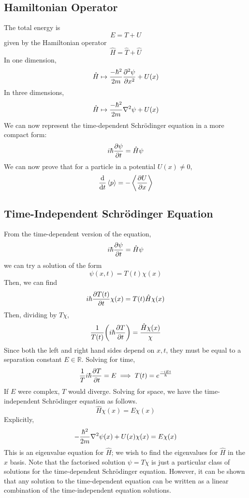 \subsection{Hamiltonian Operator}
The total energy is
\[
	E = T + U
\]
given by the Hamiltonian operator
\[
	\hat H = \hat T + \hat U
\]
In one dimension,
\[
	\hat H \mapsto \frac{-\hbar^2}{2m} \pdv[2]{\psi}{x} + U(x)
\]
In three dimensions,
\[
	\hat H \mapsto \frac{-\hbar^2}{2m} \laplacian \psi + U(x)
\]
We can now represent the time-dependent Schr\"odinger equation in a more compact form:
\[
	i\hbar \pdv{\psi}{t} = \hat H \psi
\]
We can now prove that for a particle in a potential \( U(x) \neq 0 \),
\[
	\dv{t} \left\langle{p}\right\rangle = -\left\langle{\pdv{U}{x}}\right\rangle
\]

\subsection{Time-Independent Schr\"odinger Equation}
From the time-dependent version of the equation,
\[
	i\hbar \pdv{\psi}{t} = \hat H \psi
\]
we can try a solution of the form
\[
	\psi(x,t) = T(t) \chi(x)
\]
Then, we can find
\[
	i \hbar \pdv{T(t)}{t} \chi(x) = T(t) \hat H \chi(x)
\]
Then, dividing by \( T \chi \),
\[
	\frac{1}{T(t)} \qty(i \hbar \pdv{T}{t}) = \frac{\hat H \chi(x)}{\chi}
\]
Since both the left and right hand sides depend on \( x, t \), they must be equal to a separation constant \( E \in \mathbb R \).
Solving for time,
\[
	\frac{1}{T} i \hbar \pdv{T}{t} = E \implies T(t) = e^{\frac{-i Et}{\hbar}}
\]
If \( E \) were complex, \( T \) would diverge.
Solving for space, we have the time-independent Schr\"odinger equation as follows.
\[
	\hat H \chi(x) = E \chi(x)
\]
Explicitly,
\[
	-\frac{\hbar^2}{2m} \laplacian{\psi(x)} + U(x) \chi(x) = E \chi(x)
\]
This is an eigenvalue equation for \( \hat H \); we wish to find the eigenvalues for \( \hat H \) in the \( x \) basis.
Note that the factorised solution \( \psi = T \chi \) is just a particular class of solutions for the time-dependent Schr\"odinger equation.
However, it can be shown that any solution to the time-dependent equation can be written as a linear combination of the time-independent equation solutions.
